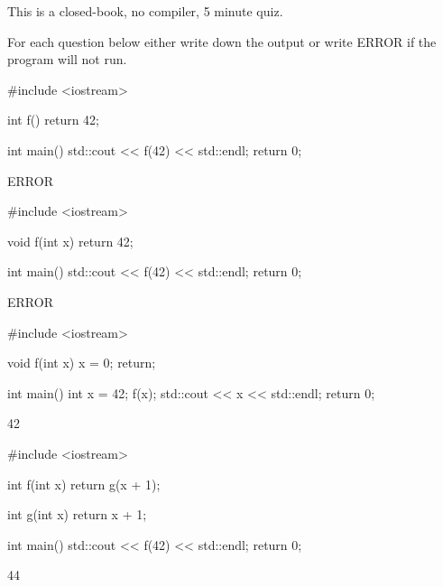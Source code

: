 

This is a closed-book, no compiler, 5 minute quiz.

For each question below either write down the output or write ERROR if the
program will not run.

\nextq
\begin{console}[fontsize=\footnotesize]
#include <iostream>

int f()
{
    return 42;
}

int main()
{
    std::cout << f(42) << std::endl;
    return 0;
}
\end{console}
\ANSWER
\begin{answercode}
ERROR
\end{answercode}

\nextq
\begin{console}[fontsize=\footnotesize]
#include <iostream>

void f(int x)
{
    return 42;
}

int main()
{
    std::cout << f(42) << std::endl;
    return 0;
}
\end{console}
\ANSWER\vspace{0.2cm}
\begin{console}
ERROR
\end{console}

\newpage
\nextq
\begin{console}[fontsize=\footnotesize]
#include <iostream>

void f(int x)
{
    x = 0;
    return;
}

int main()
{
    int x = 42;
    f(x);
    std::cout << x << std::endl;
    return 0;
}
\end{console}
\ANSWER
\begin{answercode}
42
\end{answercode}

\nextq
\begin{console}[fontsize=\footnotesize]
#include <iostream>

int f(int x)
{
    return g(x + 1);
}

int g(int x)
{
    return x + 1;
}

int main()
{
    std::cout << f(42) << std::endl;
    return 0;
}
\end{console}
\ANSWER
\begin{answercode}
44
\end{answercode}

